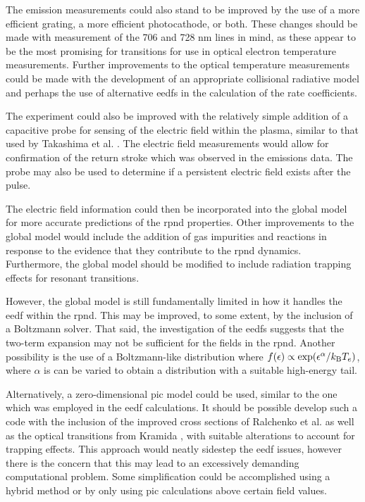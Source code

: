 The emission measurements could also stand to be improved by the use of a more
efficient grating, a more efficient photocathode, or both. These changes should
be made with measurement of the 706 and 728 nm lines in mind, as these appear to
be the most promising for transitions for use in optical electron temperature
measurements. Further improvements to the optical temperature measurements could
be made with the development of an appropriate collisional radiative model and
perhaps the use of alternative \acs{eedf}s in the calculation of the rate
coefficients.

The experiment could also be improved with the relatively simple addition of a
capacitive probe for sensing of the electric field within the plasma, similar to
that used by Takashima et al. \cite{Takashima2011}. The electric field
measurements would allow for confirmation of the return stroke which was
observed in the emissions data. The probe may also be used to determine if a
persistent electric field exists after the pulse.

The electric field information could then be incorporated into the global model
for more accurate predictions of the \acs{rpnd} properties. Other improvements
to the global model would include the addition of gas impurities and reactions
in response to the evidence that they contribute to the \acs{rpnd} dynamics.
Furthermore, the global model should be modified to include radiation trapping
effects for resonant transitions.

However, the global model is still fundamentally limited in how it handles the
\acs{eedf} within the \acs{rpnd}. This may be improved, to some extent, by the
inclusion of a Boltzmann solver. That said, the investigation of the \acs{eedf}s
suggests that the two-term expansion may not be sufficient for the fields in the
\acs{rpnd}. Another possibility is the use of a Boltzmann-like distribution
where $f(\epsilon)\propto \exp (\epsilon^\alpha / k_\mathrm{B} T_e)$, where $\alpha$ is
can be varied to obtain a distribution with a suitable high-energy tail.

Alternatively, a zero-dimensional \acs{pic} model could be used, similar to the
one which was employed in the \acs{eedf} calculations. It should be possible
develop such a code with the inclusion of the improved cross sections of
Ralchenko et al. \cite{Ralchenko2008} as well as the optical transitions from
Kramida \cite{Kramida2012}, with suitable alterations to account for trapping
effects. This approach would neatly sidestep the \acs{eedf} issues, however
there is the concern that this may lead to an excessively demanding
computational problem. Some simplification could be accomplished using a hybrid
method or by only using \acs{pic} calculations above certain field values.

